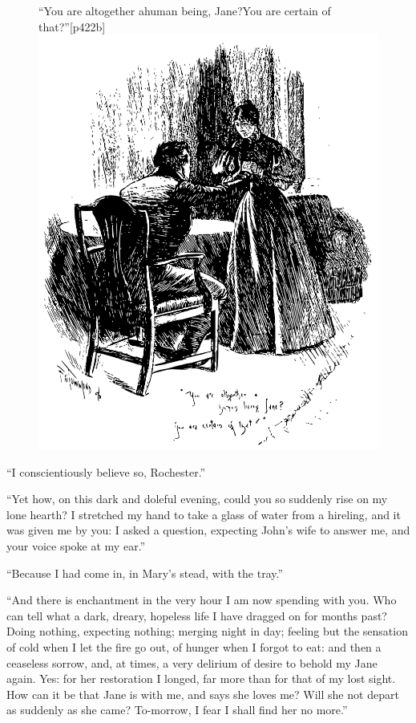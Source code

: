 \begin{figure}
	\begin{sidecaption}{\enquote{You are altogether a\linebreak human being, Jane?\linebreak You are certain of that?}}[p422b]
		\centering
		\includegraphics[width=\linewidth]{images/p422b.pdf}
	\end{sidecaption}
\end{figure}

\enquote{I conscientiously believe so, \Mr{} Rochester.}

\enquote{Yet how, on this dark and doleful evening, could you so
	suddenly rise on my lone hearth? I stretched my hand to take a glass of
	water from a hireling, and it was given me by you: I asked a question,
	expecting John's wife to answer me, and your voice spoke at my ear.}

\enquote{Because I had come in, in Mary's stead, with the tray.}

\enquote{And there is enchantment in the very hour I am now spending
	with you. Who can tell what a dark, dreary, hopeless life I have
	dragged on for months past? Doing nothing, expecting nothing; merging
	night in day; feeling but the sensation of cold when I let the fire go
	out, of hunger when I forgot to eat: and then a ceaseless sorrow, and,
	at times, a very delirium of desire to behold my Jane again. Yes: for
	her restoration I longed, far more than for that of my lost sight. How
	can it be that Jane is with me, and says she loves me? Will she not
	depart as suddenly as she came? To-morrow, I fear I shall find her no
	more.}

